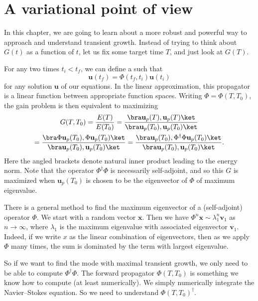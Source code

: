 \documentclass[a4paper]{article}
\begin{document}
\section{A variational point of view}
In this chapter, we are going to learn about a more robust and powerful way to approach and understand transient growth. Instead of trying to think about $G(t)$ as a function of $t$, let us fix some target time $T$, and just look at $G(T)$.

For any two times $t_i < t_f$, we can define a  such that
\[
  \mathbf{u}(t_f) = \Phi(t_f, t_i) \mathbf{u}(t_i)
\]
for any solution $\mathbf{u}$ of our equations. In the linear approximation, this propagator is a linear function between appropriate function spaces. Writing $\Phi = \Phi(T, T_0)$, the gain problem is then equivalent to maximizing
\begin{multline*}
  G(T, T_0) = \frac{E(T)}{E(T_0)} = \frac{\bra \mathbf{u}_p(T), \mathbf{u}_p(T)\ket}{ \bra \mathbf{u}_p(T_0), \mathbf{u}_p(T_0)\ket}\\
  = \frac{\bra \Phi \mathbf{u}_p(T_0), \Phi \mathbf{u}_p(T_0)\ket}{\bra \mathbf{u}_p(T_0), \mathbf{u}_p(T_0)\ket} = \frac{\bra \mathbf{u}_p(T_0), \Phi^\dagger \Phi \mathbf{u}_p(T_0)\ket}{\bra \mathbf{u}_p(T_0), \mathbf{u}_p(T_0)\ket}.
\end{multline*}
Here the angled brackets denote natural inner product leading to the energy norm. Note that the operator $\Phi^\dagger \Phi$ is necessarily self-adjoint, and so this $G$ is maximized when $\mathbf{u}_p(T_0)$ is chosen to be the eigenvector of $\Phi$ of maximum eigenvalue.

There is a general method to find the maximum eigenvector of a (self-adjoint) operator $\Phi$. We start with a random vector $\mathbf{x}$. Then we have $\Phi^n \mathbf{x} \sim \lambda_1^n \mathbf{v}_1$ as $n \to \infty$, where $\lambda_1$ is the maximum eigenvalue with associated eigenvector $\mathbf{v}_1$. Indeed, if we write $x$ as the linear combination of eigenvectors, then as we apply $\Phi$ many times, the sum is dominated by the term with largest eigenvalue.

So if we want to find the mode with maximal transient growth, we only need to be able to compute $\Phi^\dagger \Phi$. The forward propagator $\Phi(T, T_0)$ is something we know how to compute (at least numerically). We simply numerically integrate the Navier--Stokes equation. So we need to understand $\Phi(T, T_0)^\dagger$.
\end{document}
